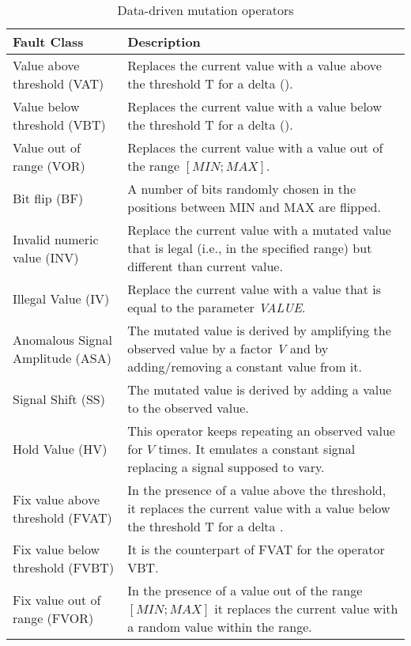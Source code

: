 

\begin{table*}[tb]
\caption{Data-driven mutation operators}
\label{table:damat:operators}
\scriptsize
\begin{tabular}{|p{40mm}|p{90mm}|}
\hline
\textbf{Fault Class}&\textbf{Description}\\
\hline
Value above threshold (VAT)&
Replaces the current value with a value above the threshold T for a delta (\D). 
\\
\hline
Value below threshold (VBT)&
Replaces the current value with a value below the threshold T for a delta (\D). 
\\
\hline
Value out of range (VOR)&
Replaces the current value with a value out of the range $[MIN;MAX]$.\\
\hline
Bit flip (BF)&
A number of bits randomly chosen in the positions between MIN and MAX are flipped.
\\
\hline
Invalid numeric value (INV)&
Replace the current value with a mutated value that is legal (i.e., in the specified range) but different than current value. 
\\
\hline
Illegal Value (IV)
&
Replace the current value with a value that is equal to the parameter \emph{VALUE}. 
\\
\hline
Anomalous Signal Amplitude (ASA)
&
The mutated value is derived by amplifying the observed value by a factor \emph{V} and by adding/removing a constant value \D from it. 
\\
\hline
Signal Shift (SS)
&
The mutated value is derived by adding a value \D to the observed value. 
\\
\hline
Hold Value (HV)
&
This operator keeps repeating an observed value for $V$ times. It emulates a constant signal replacing a signal supposed to vary.
\\
\hline
Fix value above threshold (FVAT)&
In the presence of a value above the threshold, it replaces the current value with a value below the threshold T for a delta \D. 
\\
\hline
Fix value below threshold (FVBT)&
It is the counterpart of FVAT for the operator VBT.
\\
\hline
Fix value out of range (FVOR)&
In the presence of a value out of the range  $[MIN;MAX]$ it replaces the current value with a random value within the range. 
\\
\hline
\end{tabular}
\end{table*}%